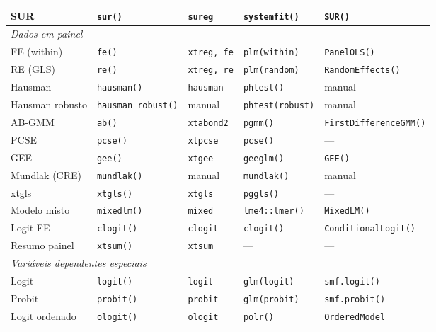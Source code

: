 {\begin{longtable}{lllll}
SUR             & \texttt{sur()}        & \texttt{sureg}        & \texttt{systemfit()}   & \texttt{SUR()} \\
\midrule
\multicolumn{5}{l}{\textit{Dados em painel}} \\
FE (within)     & \texttt{fe()}         & \texttt{xtreg, fe}    & \texttt{plm(within)}   & \texttt{PanelOLS()} \\
RE (GLS)        & \texttt{re()}         & \texttt{xtreg, re}    & \texttt{plm(random)}   & \texttt{RandomEffects()} \\
Hausman         & \texttt{hausman()}    & \texttt{hausman}      & \texttt{phtest()}      & manual \\
Hausman robusto & \texttt{hausman\_robust()} & manual           & \texttt{phtest(robust)} & manual \\
AB-GMM          & \texttt{ab()}         & \texttt{xtabond2}     & \texttt{pgmm()}        & \texttt{FirstDifferenceGMM()} \\
PCSE            & \texttt{pcse()}       & \texttt{xtpcse}       & \texttt{pcse()}        & — \\
GEE             & \texttt{gee()}        & \texttt{xtgee}        & \texttt{geeglm()}      & \texttt{GEE()} \\
Mundlak (CRE)   & \texttt{mundlak()}    & manual                & \texttt{mundlak()}     & manual \\
xtgls           & \texttt{xtgls()}      & \texttt{xtgls}        & \texttt{pggls()}       & — \\
Modelo misto    & \texttt{mixedlm()}    & \texttt{mixed}        & \texttt{lme4::lmer()}  & \texttt{MixedLM()} \\
Logit FE        & \texttt{clogit()}     & \texttt{clogit}       & \texttt{clogit()}      & \texttt{ConditionalLogit()} \\
Resumo painel   & \texttt{xtsum()}      & \texttt{xtsum}        & —                      & —                     \\
\midrule
\multicolumn{5}{l}{\textit{Variáveis dependentes especiais}} \\
Logit           & \texttt{logit()}      & \texttt{logit}        & \texttt{glm(logit)}    & \texttt{smf.logit()} \\
Probit          & \texttt{probit()}     & \texttt{probit}       & \texttt{glm(probit)}   & \texttt{smf.probit()} \\
Logit ordenado  & \texttt{ologit()}     & \texttt{ologit}       & \texttt{polr()}        & \texttt{OrderedModel} \\

\end{longtable}}
